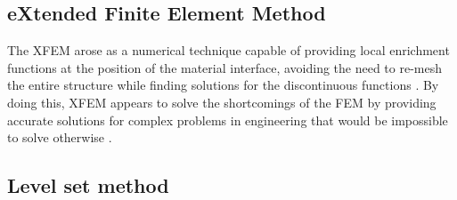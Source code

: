 
\subsection{eXtended Finite Element Method}

The XFEM arose as a numerical technique capable of providing local enrichment functions at the position of the material interface, avoiding the need to re-mesh the entire structure while finding solutions for the discontinuous functions \citep{FB:10}. By doing this, XFEM appears to solve the shortcomings of the FEM by providing accurate solutions for complex problems in engineering that would be impossible to solve otherwise \citep{AH:08}.


\subsection{Level set method}

